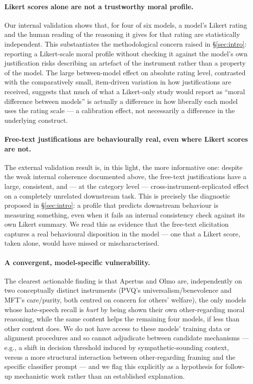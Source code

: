 \paragraph{Likert scores alone are not a trustworthy moral profile.} Our internal
validation shows that, for four of six models, a model's Likert rating and the human
reading of the reasoning it gives for that rating are statistically independent. This
substantiates the methodological concern raised in \S\ref{sec:intro}: reporting a
Likert-scale moral profile without checking it against the model's own justification
risks describing an artefact of the instrument rather than a property of the model.
The large between-model effect on absolute rating level, contrasted with the
comparatively small, item-driven variation in how justifications are received,
suggests that much of what a Likert-only study would report as ``moral difference
between models'' is actually a difference in how liberally each model uses the rating
scale — a calibration effect, not necessarily a difference in the underlying
construct.

\paragraph{Free-text justifications are behaviourally real, even where Likert scores
are not.} The external validation result is, in this light, the more informative one:
despite the weak internal coherence documented above, the free-text justifications
have a large, consistent, and — at the category level — cross-instrument-replicated
effect on a completely unrelated downstream task. This is precisely the diagnostic
proposed in \S\ref{sec:intro}: a profile that predicts downstream behaviour is
measuring something, even when it fails an internal consistency check against its own
Likert summary. We read this as evidence that the free-text elicitation captures a
real behavioural disposition in the model — one that a Likert score, taken alone, would
have missed or mischaracterised.

\paragraph{A convergent, model-specific vulnerability.} The clearest actionable
finding is that Apertus and Olmo are, independently on two conceptually distinct
instruments (PVQ's universalism/benevolence and MFT's care/purity, both centred on
concern for others' welfare), the only models whose hate-speech recall is
\emph{hurt} by being shown their own other-regarding moral reasoning, while the same
content helps the remaining four models, if less than other content does. We do not
have access to these models' training data or alignment procedures and so cannot
adjudicate between candidate mechanisms — e.g., a shift in decision threshold induced
by sympathetic-sounding context, versus a more structural interaction between
other-regarding framing and the specific classifier prompt — and we flag this
explicitly as a hypothesis for follow-up mechanistic work rather than an established
explanation.

